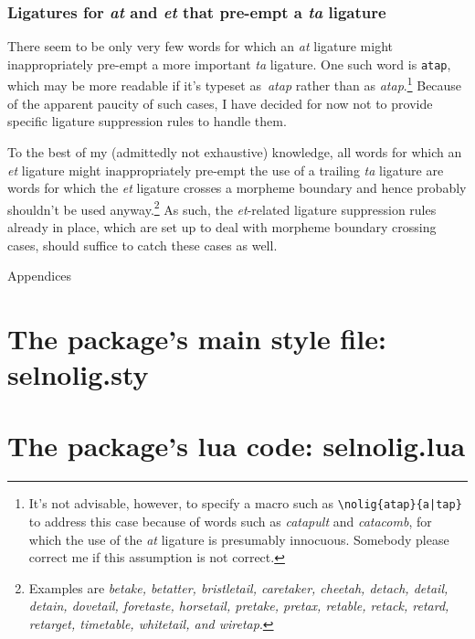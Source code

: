 \documentclass[12pt]{article}
\newcommand{\pkg}[1]{\textsf{#1}}
\newcommand{\opt}[1]{\texttt{#1}}
\let\oldappendix\appendix
\renewcommand\appendix{%
   \clearpage
   \addtocontents{toc}{\protect{\vspace\baselineskip}}
   \addtocontents{toc}{\protect{\mdseries Appendices\par}}
   \noindent
   {\Large Appendices}
   \oldappendix}
\begin{document}
\subsubsection{Ligatures for \emph{at} and \emph{et} that pre-empt a \emph{ta} ligature}

There seem to be only very few words for which an \emph{at} ligature might inappropriately pre-empt a more important \emph{ta} ligature. One such word is \opt{atap}, which may be more readable if it's typeset as~\emph{a\mbox{ta}p} rather than as \emph{atap}.\footnote{It's not advisable, however, to specify a macro such as \Verb+\nolig{atap}{a|tap}+ to address this case because of words such as \emph{catapult} and \emph{catacomb}, for which the use of the \emph{at} ligature is presumably innocuous. Somebody please correct me if this assumption is not correct.}  Because of the apparent paucity of such cases, I have decided for now not to provide specific ligature suppression rules to handle them.

To the best of my (admittedly not exhaustive) knowledge, all words for which an \emph{et} ligature might inappropriately pre-empt the use of a trailing \emph{ta} ligature are words for which the \emph{et} ligature crosses a morpheme boundary and hence probably shouldn't be used anyway.\footnote{Examples are \emph{betake, betatter, bristletail, caretaker, cheetah, detach, detail, detain, dovetail, foretaste, horsetail, pretake, pretax, retable, retack, retard, retarget, timetable, whitetail, \emph{and} wiretap}. } As such, the \emph{et}-related ligature suppression rules already in place, which are set up to deal with morpheme boundary crossing cases, should suffice to catch these cases as well.



\appendix
{}

\small

\section[The package's main style file: selnolig.sty]
{The package's main style file: \pkg{selnolig.sty}}


\clearpage
\section[The package's lua code: selnolig.lua]{The package's lua code: \pkg{selnolig.lua}}
\label{sec:luacode}
\end{document}
